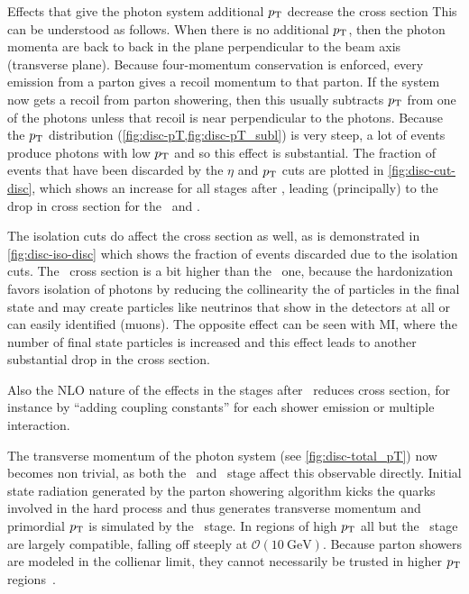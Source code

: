 Effects that give the photon system additional $p_\mathrm{T}$ decrease the
cross section This can be understood as follows. When there is no
additional \(p_\mathrm{T}\), then the photon momenta are back to back in the
plane perpendicular to the beam axis (transverse plane). Because
four-momentum conservation is enforced, every emission from a parton
gives a recoil momentum to that parton. If the system now gets a
recoil from parton showering, then this usually subtracts \(p_\mathrm{T}\) from
one of the photons unless that recoil is near perpendicular to the
photons. Because the \(p_\mathrm{T}\) distribution
(\cref{fig:disc-pT,fig:disc-pT_subl}) is very steep, a lot of events
produce photons with low \(p_\mathrm{T}\) and so this effect is
substantial. The fraction of events that have been discarded by the
\(\eta\) and \(p_\mathrm{T}\) cuts are plotted in \cref{fig:disc-cut-disc},
which shows an increase for all stages after \stone, leading
(principally) to the drop in cross section for the \sttwo\ and
\stthree.

The isolation cuts do affect the cross section as well, as is
demonstrated in \cref{fig:disc-iso-disc} which shows the fraction of
events discarded due to the isolation cuts. The \stfour\ cross section
is a bit higher than the \stthree\ one, because the hardonization
favors isolation of photons by reducing the collinearity the of
particles in the final state and may create particles like neutrinos
that show in the detectors at all or can easily identified
(muons). The opposite effect can be seen with MI, where the number of
final state particles is increased and this effect leads to another
substantial drop in the cross section.

Also the NLO nature of the effects in the stages after \stone\ reduces
cross section, for instance by ``adding coupling constants'' for each
shower emission or multiple interaction.

The transverse momentum of the photon system (see
\cref{fig:disc-total_pT}) now becomes non trivial, as both the \sttwo\
and \stthree\ stage affect this observable directly. Initial state
radiation generated by the parton showering algorithm kicks the quarks
involved in the hard process and thus generates transverse momentum
and primordial \(p_\mathrm{T}\) is simulated by the \stthree\ stage. In regions
of high \(p_\mathrm{T}\) all but the \stone\ stage are largely compatible,
falling off steeply at
\(\mathcal{O}(\SI{10}{\giga\electronvolt})\). Because parton showers
are modeled in the collienar limit, they cannot necessarily be trusted
in higher \(p_\mathrm{T}\) regions~\cite{buckley:2011ge}.

